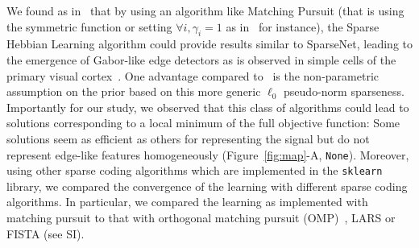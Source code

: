 \documentclass[vision,article,submit,oneauthor,pdftex]{Definitions/mdpi}
\newcommand{\coef}{\mathbf{a}} %
\newcommand{\image}{\mathbf{y}} %
\newcommand{\dico}{\Phi} %
\newcommand{\eqdef}{\ensuremath{\stackrel{\mbox{\upshape\tiny def.}}{=}}}
\newcommand{\seeFig}[1]{Figure~\ref{fig:#1}}%
\begin{document}
{%
We found as in~\citep{Rehn07} that by using an algorithm like Matching Pursuit (that is using the symmetric function or setting $\forall i, \gamma_i=1$ as in~\citep{Mairal14} for instance), the Sparse Hebbian Learning algorithm could provide results similar to {\sc SparseNet}, leading to the emergence of Gabor-like edge detectors as is observed in simple cells of the primary visual cortex~\citep{Fischer07}. One advantage compared to~\citep{Olshausen97} is the non-parametric assumption on the prior based on this more generic $\ell_0$ pseudo-norm sparseness. Importantly for our study, we observed that this class of algorithms could lead to solutions corresponding to a local minimum of the full objective function: Some solutions seem as efficient as others for representing the signal but do not represent edge-like features homogeneously (\seeFig{map}-A, \texttt{None}). %
Moreover, using other sparse coding algorithms which are implemented in the \verb+sklearn+ library, we compared the convergence of the learning with different sparse coding algorithms. In particular, we compared the learning as implemented with matching pursuit to that with orthogonal matching pursuit (OMP)~\citep{pati1993orthogonal}, LARS or FISTA (see SI). %
}
\end{document}
